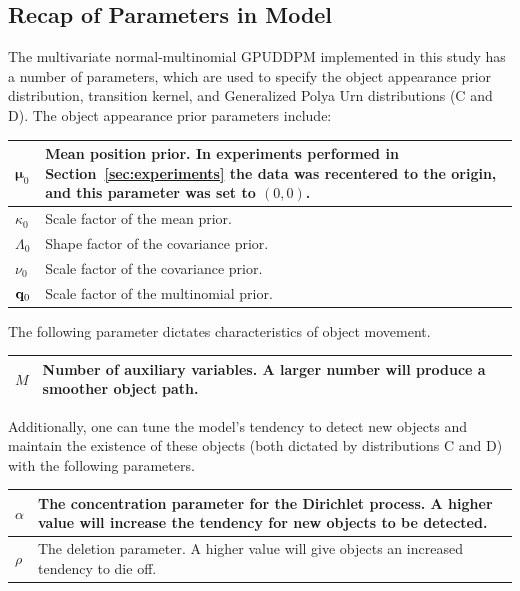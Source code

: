 \documentclass[twocolumn, final]{svjour3}
\begin{document}
\subsection{Recap of Parameters in Model}
\label{sec:recapofparameters}

The multivariate normal-multinomial GPUDDPM implemented in this study has a number of parameters, which are used to specify the object appearance prior distribution, transition kernel, and Generalized Polya Urn distributions (C and D). %
The object appearance prior parameters include:
\begin{center}
\begin{tabular}[c]{| l |  p{7cm} | }
\hline
$\boldsymbol{\mu}_{0}$  &  Mean position prior. In experiments performed in Section~\ref{sec:experiments} the data was recentered to the origin, and this parameter was set to $(0,0)$. \\ \hline
$\kappa_{0}$  &  Scale factor of the mean prior.\\ \hline
$\Lambda_{0}$  &  Shape factor of the covariance prior.\\ \hline
$\nu_{0}$  &  Scale factor of the covariance prior.\\ \hline
$\bold{q}_{0}$  &  Scale factor of the multinomial prior. \\
\hline
\end{tabular}
\end{center} \vspace{3mm}
The following parameter dictates characteristics of object movement.
\begin{center}
\begin{tabular}[c]{ | l | p{7cm} | }
\hline
$M$  &  Number of auxiliary variables. A larger number will produce a smoother object path.\\
\hline
\end{tabular}
\end{center} \vspace{3mm}
Additionally, one can tune the model's tendency to detect new objects and maintain the existence of these objects (both dictated by distributions C and D) with the following parameters.
\begin{center}
\begin{tabular}[c]{ | l | p{7cm} | }
\hline
$\alpha$  &  The concentration parameter for the Dirichlet process. A higher value will increase the tendency for new objects to be detected.\\ \hline
$\rho$  &  The deletion parameter. A higher value will give objects an increased tendency to die off. \\
\hline
\end{tabular}
\end{center}
\end{document}
